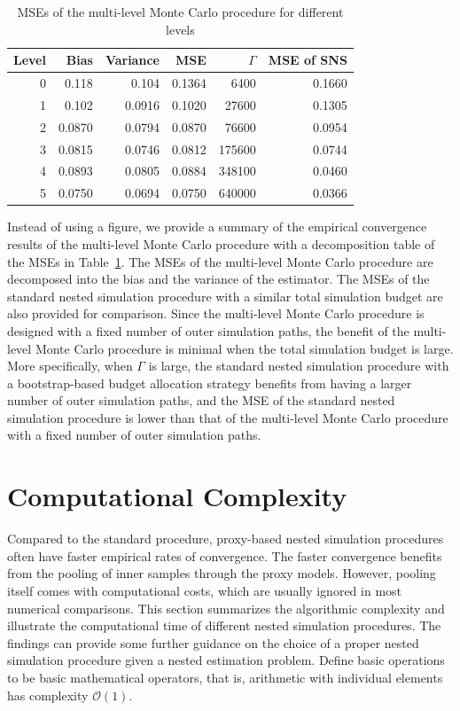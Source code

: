 \begin{table}[ht]
    \centering
    \begin{tabular}{rrrrrr}
    \toprule
    \textbf{Level} & \textbf{Bias} & \textbf{Variance} & \textbf{MSE} & $\Gamma$ & \textbf{MSE of SNS} \\ 
    \hline\hline
    0 & 0.118  & 0.104  & 0.1364 & 6400     & 0.1660    \\
    1 & 0.102  & 0.0916 & 0.1020 & 27600    & 0.1305    \\
    2 & 0.0870 & 0.0794 & 0.0870 & 76600    & 0.0954    \\
    3 & 0.0815 & 0.0746 & 0.0812 & 175600   & 0.0744    \\
    4 & 0.0893 & 0.0805 & 0.0884 & 348100   & 0.0460    \\
    5 & 0.0750 & 0.0694 & 0.0750 & 640000   & 0.0366    \\
    \bottomrule
    \end{tabular}
    \caption{MSEs of the multi-level Monte Carlo procedure for different levels}
    \label{tab1:mlmc-mse}
\end{table}

Instead of using a figure, we provide a summary of the empirical convergence results of the multi-level Monte Carlo procedure with a decomposition table of the MSEs in Table~\ref{tab1:mlmc-mse}.
The MSEs of the multi-level Monte Carlo procedure are decomposed into the bias and the variance of the estimator.
The MSEs of the standard nested simulation procedure with a similar total simulation budget are also provided for comparison.
Since the multi-level Monte Carlo procedure is designed with a fixed number of outer simulation paths, the benefit of the multi-level Monte Carlo procedure is minimal when the total simulation budget is large.
More specifically, when $\Gamma$ is large, the standard nested simulation procedure with a bootstrap-based budget allocation strategy benefits from having a larger number of outer simulation paths, and the MSE of the standard nested simulation procedure is lower than that of the multi-level Monte Carlo procedure with a fixed number of outer simulation paths.


\section{Computational Complexity} \label{sec1:computational-complexity}
Compared to the standard procedure, proxy-based nested simulation procedures often have faster empirical rates of convergence.
The faster convergence benefits from the pooling of inner samples through the proxy models. 
However, pooling itself comes with computational costs, which are usually ignored in most numerical comparisons. 
This section summarizes the algorithmic complexity and illustrate the computational time of different nested simulation procedures.
The findings can provide some further guidance on the choice of a proper nested simulation procedure given a nested estimation problem.
Define basic operations to be basic mathematical operators, that is, arithmetic with individual elements has complexity $\mathcal{O}(1)$.

